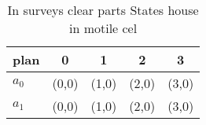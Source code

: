 \documentclass[a4paper]{article}
\begin{document}
\begin{table}
\begin{adjustbox}{width=0.8\columnwidth}
\begin{tabular}{|l|l|l|l|l|}
\hline
\textbf{plan} & \multicolumn{1}{c|}{\textbf{0}} & \multicolumn{1}{c|}{\textbf{1}} & \multicolumn{1}{c|}{\textbf{2}} & \multicolumn{1}{c|}{\textbf{3}} \\ \hline
\textbf{$a_0$}  & (0,0) & (1,0) & (2,0) & (3,0) \\ \hline
\textbf{$a_1$}  & (0,0) & (1,0) & (2,0) & (3,0) \\ \hline
\end{tabular}
\end{adjustbox}
\caption{In surveys clear parts States house in motile cel
}
\end{table}
\end{document}
